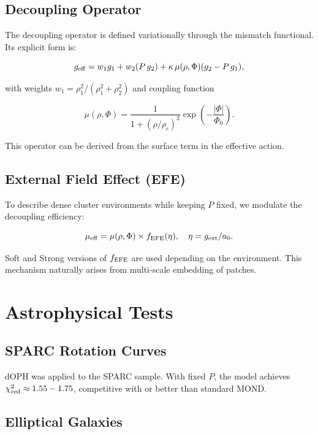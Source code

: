 \documentclass[12pt,a4paper]{article}
\begin{document}
\subsection{Decoupling Operator}

The decoupling operator is defined variationally through the mismatch functional. Its explicit form is:

\begin{equation}
g_{\rm eff} = w_1 g_1 + w_2 (P \, g_2) + \kappa \, \mu(\rho, \Phi) (g_2 - P \, g_1),
\end{equation}

with weights \(w_1 = \rho_1^2/(\rho_1^2 + \rho_2^2)\) and coupling function

\[
\mu(\rho, \Phi) = \frac{1}{1 + (\rho / \rho_c)^2} \exp\left( -\frac{|\Phi|}{\Phi_0} \right).
\]

This operator can be derived from the surface term in the effective action.

\subsection{External Field Effect (EFE)}

To describe dense cluster environments while keeping \(P\) fixed, we modulate the decoupling efficiency:

\[
\mu_{\rm eff} = \mu(\rho, \Phi) \times f_{\rm EFE}(\eta), \quad \eta = g_{\rm ext}/a_0.
\]

Soft and Strong versions of \(f_{\rm EFE}\) are used depending on the environment. This mechanism naturally arises from multi-scale embedding of patches.

\section{Astrophysical Tests}

\subsection{SPARC Rotation Curves}

dOPH was applied to the SPARC sample. With fixed \(P\), the model achieves \(\chi^2_{\rm red} \approx 1.55-1.75\), competitive with or better than standard MOND.

\subsection{Elliptical Galaxies}
\end{document}
